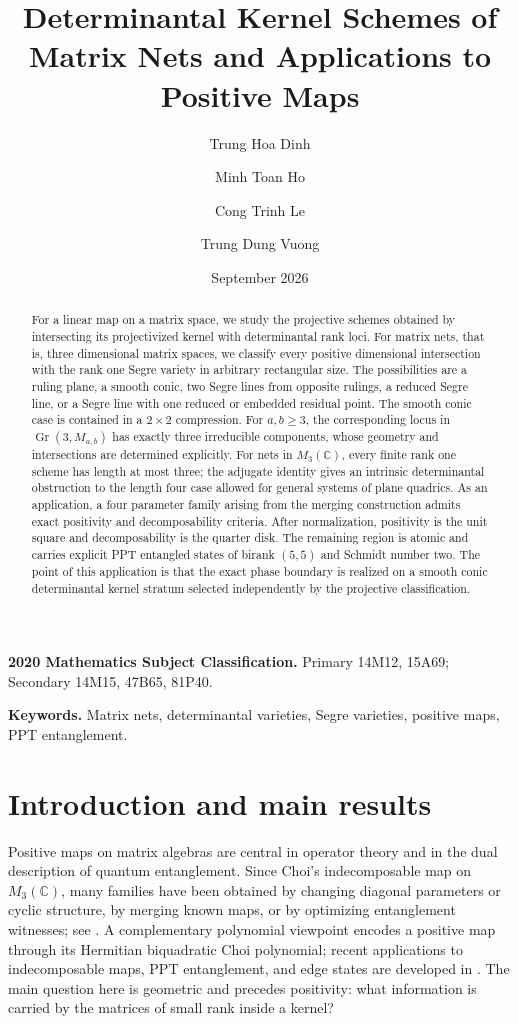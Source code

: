 \documentclass[11pt]{amsart}
\title[Determinantal Kernel Schemes of Matrix Nets]{Determinantal Kernel Schemes of Matrix Nets and Applications to Positive Maps}
\author{Trung Hoa Dinh}
\author{Minh Toan Ho}
\author{Cong Trinh Le}
\author{Trung Dung Vuong}
\date{September 2026}
\newcommand{\chg}[1]{#1}
\newcommand{\newrev}[1]{#1}
\newcommand{\Gr}{\operatorname{Gr}}
\theoremstyle{plain}
\theoremstyle{definition}
\theoremstyle{remark}
\begin{document}
\begin{abstract}
{
For a linear map on a matrix space, we study the projective schemes obtained by intersecting its projectivized kernel with determinantal rank loci. For matrix nets, that is, \chg{three dimensional} matrix spaces, we classify every \chg{positive dimensional} intersection with the \chg{rank one} Segre variety in arbitrary rectangular size. The possibilities are a ruling plane, a smooth conic, two Segre lines from opposite rulings, a reduced Segre line, or a Segre line with one reduced or embedded residual point. The smooth conic case is contained in a $2\times2$ compression. For $a,b\ge3$, the corresponding locus in $\Gr(3,M_{a,b})$ has exactly three irreducible components, whose geometry and intersections are determined explicitly. For nets in $M_3(\mathbb C)$, every finite \chg{rank one} scheme has length at most three; \newrev{the adjugate identity gives an intrinsic determinantal obstruction to the length four case allowed for general systems of plane quadrics.} As an application, a \chg{four parameter} family arising from the merging construction admits exact positivity and decomposability criteria. After normalization, positivity is the unit square and decomposability is the quarter disk. The remaining region is atomic and carries explicit PPT entangled states of birank $(5,5)$ and Schmidt number two. \newrev{The point of this application is that the exact phase boundary is realized on a smooth conic determinantal kernel stratum selected independently by the projective classification.}
}
\end{abstract}
\maketitle

\noindent\chg{\textbf{2020 Mathematics Subject Classification.} Primary 14M12, 15A69; Secondary 14M15, 47B65, 81P40.}

\smallskip
\noindent\chg{\textbf{Keywords.} Matrix nets, determinantal varieties, Segre varieties, positive maps, PPT entanglement.}

\section{Introduction and main results}

Positive maps on matrix algebras are central in operator theory and in the dual description of quantum entanglement. Since Choi's indecomposable map on $M_3(\mathbb C)$, many families have been obtained by changing diagonal parameters or cyclic structure, by merging known maps, or by optimizing entanglement witnesses; see \cite{Bera2025,Choi1975,ChoKyeLee1992,ChruscinskiMarciniakRutkowski2018,Kye1992,MarciniakRutkowski2017,MillerOlkiewicz2015}. A complementary polynomial viewpoint encodes a positive map through its Hermitian biquadratic Choi polynomial; recent applications to indecomposable maps, PPT entanglement, and edge states are developed in \cite{HoLeLeOsaka2026}. The main question here is geometric and precedes positivity: what information is carried by the matrices of small rank inside a kernel?
\end{document}
